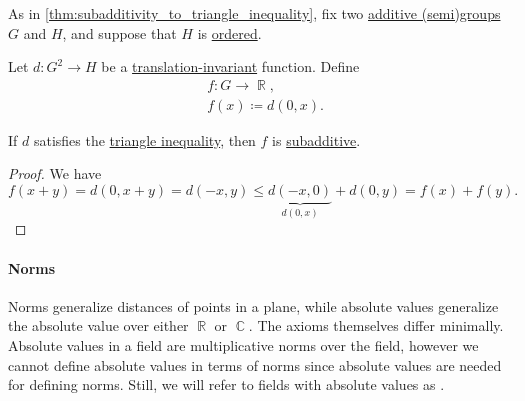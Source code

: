 \begin{proposition}\label{thm:triangle_inequality_to_subadditivity}
  As in \cref{thm:subadditivity_to_triangle_inequality}, fix two \hyperref[def:additive_semigroup]{additive (semi)groups} \( G \) and \( H \), and suppose that \( H \) is \hyperref[def:ordered_semigroup]{ordered}.

  Let \( d: G^2 \to H \) be a \hyperref[def:translation_invariant_binary_function]{translation-invariant} function. Define
  \begin{equation*}
    \begin{aligned}
      &f: G \to \BbbR, \\
      &f(x) \coloneqq d(0, x).
    \end{aligned}
  \end{equation*}

  If \( d \) satisfies the \hyperref[def:triangle_inequality]{triangle inequality}, then \( f \) is \hyperref[def:additive_function/sub]{subadditive}.
\end{proposition}
\begin{proof}
  We have
  \begin{equation*}
    f(x + y) = d(0, x + y) = d(-x, y) \leq \underbrace{d(-x, 0)}_{d(0, x)} + d(0, y) = f(x) + f(y).
  \end{equation*}
\end{proof}

\paragraph{Norms}

\begin{remark}\label{rem:normed_fields}
  Norms generalize distances of points in a plane, while absolute values generalize the absolute value over either \( \BbbR \) or \( \BbbC \). The axioms themselves differ minimally. Absolute values in a field are multiplicative norms over the field, however we cannot define absolute values in terms of norms since absolute values are needed for defining norms. Still, we will refer to fields with absolute values as .
\end{remark}

